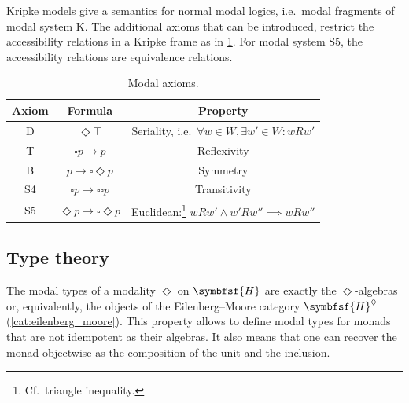     Kripke models give a semantics for normal modal logics, i.e.~modal fragments of modal system K. The additional axioms that can be introduced, restrict the accessibility relations in a Kripke frame as in \cref{table:modal_axioms}. For modal system S5, the accessibility relations are equivalence relations.
    \begin{table}[ht!]
        \centering
        \begin{tabular}{ccc}
            \toprule
            Axiom&Formula&Property\\
            \midrule
            D&$\Diamond\top$&Seriality, i.e.~$\forall w\in W,\exists w'\in W:wRw'$\\
            T&$\square p\rightarrow p$&Reflexivity\\
            B&$p\rightarrow\square\Diamond p$&Symmetry\\
            S4&$\square p\rightarrow\square\square p$&Transitivity\\
            S5&$\Diamond p\rightarrow\square\Diamond p$&Euclidean:\footnote{Cf.~triangle inequality.} $wRw'\land w'Rw''\implies wRw''$
            \\
            \bottomrule
        \end{tabular}
        \caption{Modal axioms.}
        \label{table:modal_axioms}
    \end{table}

\subsection{Type theory}\label{section:modal_type_theory}


    \begin{property}
        The modal types of a modality $\Diamond$ on $\symbfsf{H}$ are exactly the $\Diamond$-algebras or, equivalently, the objects of the Eilenberg--Moore category $\symbfsf{H}^\Diamond$ (\cref{cat:eilenberg_moore}). This property allows to define modal types for monads that are not idempotent as their algebras. It also means that one can recover the monad objectwise as the composition of the unit and the inclusion.
    \end{property}

